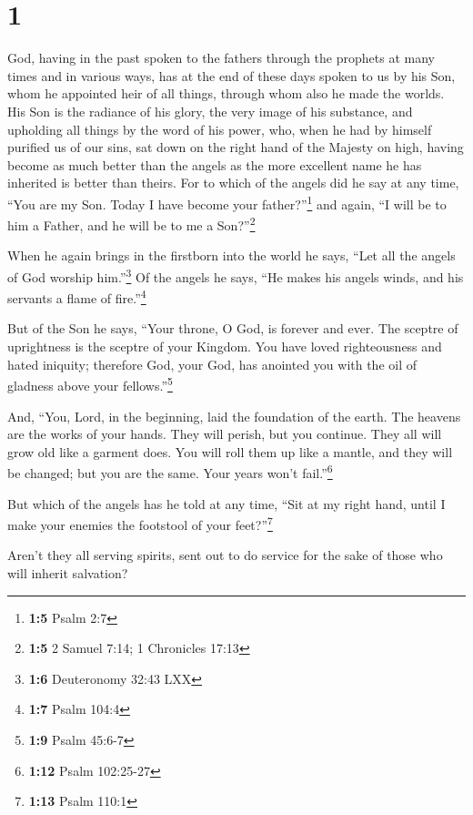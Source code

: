 \hypertarget{section}{%
\section{1}\label{section}}

 God, having in the past spoken to the fathers through the
prophets at many times and in various ways,  has at the
end of these days spoken to us by his Son, whom he appointed heir of all
things, through whom also he made the worlds.  His Son is
the radiance of his glory, the very image of his substance, and
upholding all things by the word of his power, who, when he had by
himself purified us of our sins, sat down on the right hand of the
Majesty on high,  having become as much better than the
angels as the more excellent name he has inherited is better than
theirs.  For to which of the angels did he say at any
time, ``You are my Son. Today I have become your father?''\footnote{\textbf{1:5}
  Psalm 2:7} and again, ``I will be to him a Father, and he will be to
me a Son?''\footnote{\textbf{1:5} 2 Samuel 7:14; 1 Chronicles 17:13}

 When he again brings in the firstborn into the world he
says, ``Let all the angels of God worship him.''\footnote{\textbf{1:6}
  Deuteronomy 32:43 LXX}  Of the angels he says, ``He
makes his angels winds, and his servants a flame of fire.''\footnote{\textbf{1:7}
  Psalm 104:4}

 But of the Son he says, ``Your throne, O God, is forever
and ever. The sceptre of uprightness is the sceptre of your Kingdom.
 You have loved righteousness and hated iniquity;
therefore God, your God, has anointed you with the oil of gladness above
your fellows.''\footnote{\textbf{1:9} Psalm 45:6-7}

 And, ``You, Lord, in the beginning, laid the foundation
of the earth. The heavens are the works of your hands. 
They will perish, but you continue. They all will grow old like a
garment does.  You will roll them up like a mantle, and
they will be changed; but you are the same. Your years won't
fail.''\footnote{\textbf{1:12} Psalm 102:25-27}

 But which of the angels has he told at any time, ``Sit
at my right hand, until I make your enemies the footstool of your
feet?''\footnote{\textbf{1:13} Psalm 110:1}

 Aren't they all serving spirits, sent out to do service
for the sake of those who will inherit salvation?

